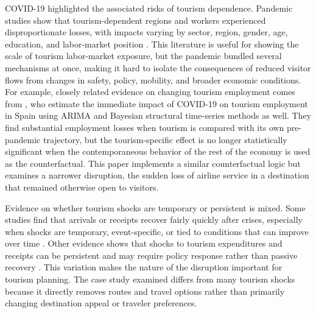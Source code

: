\documentclass[12pt]{article}
\begin{document}
COVID-19 highlighted the associated risks of tourism dependence. Pandemic studies show that tourism-dependent regions and workers experienced disproportionate losses, with impacts varying by sector, region, gender, age, education, and labor-market position \citep{duro_2021_covid19,sun_2021_vulnerable,sun_2022_job_vulnerability,zhang_yang_2025_macau}. This literature is useful for showing the scale of tourism labor-market exposure, but the pandemic bundled several mechanisms at once, making it hard to isolate the consequences of reduced visitor flows from changes in safety, policy, mobility, and broader economic conditions. For example, closely related evidence on changing tourism employment comes from \citet{perles_ribes_2021_immediate}, who estimate the immediate impact of COVID-19 on tourism employment in Spain using ARIMA and Bayesian structural time-series methods as well. They find substantial employment losses when tourism is compared with its own pre-pandemic trajectory, but the tourism-specific effect is no longer statistically significant when the contemporaneous behavior of the rest of the economy is used as the counterfactual. This paper implements a similar counterfactual logic but examines a narrower disruption, the sudden loss of airline service in a destination that remained otherwise open to visitors.

Evidence on whether tourism shocks are temporary or persistent is mixed. Some studies find that arrivals or receipts recover fairly quickly after crises, especially when shocks are temporary, event-specific, or tied to conditions that can improve over time \citep{saleh_2011_do,yucel_2020_are,morakabati_2019_a}. Other evidence shows that shocks to tourism expenditures and receipts can be persistent and may require policy response rather than passive recovery \citep{payne_nazlioglu_2023_permanent,kocak_2025_receipts}. This variation makes the nature of the disruption important for tourism planning. The case study examined differs from many tourism shocks because it directly removes routes and travel options rather than primarily changing destination appeal or traveler preferences.
\end{document}
